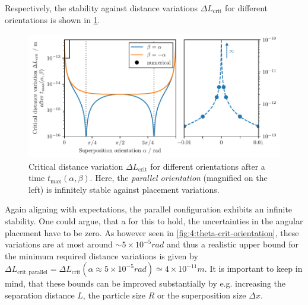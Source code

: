 Respectively, the stability against distance variations $\Delta L_\mathrm{crit}$ for different orientations is shown in \cref{fig:4:L-crit-orientation}.
\begin{figure}[!htbp]
  \centering
  \includegraphics[width=\textwidth]{./../figures/L-variance/L-crit-orientation-complete.pdf}
  \caption{Critical distance variation $\Delta L_\mathrm{crit}$ for different orientations after a time $t_\mathrm{max}(\alpha,\beta)$. Here, the \emph{parallel orientation} (magnified on the left) is infinitely stable against placement variations.}
  \label{fig:4:L-crit-orientation}
\end{figure}
Again aligning with expectations, the parallel configuration exhibits an infinite stability.
One could argue, that a for this to hold, the uncertainties in the angular placement have to be zero. As however seen in \cref{fig:4:theta-crit-orientation}, these variations are at most around $\sim 5 \times 10^{-5}\si{rad}$ and thus a realistic upper bound for the minimum required distance variations is given by $\Delta L_\mathrm{crit,parallel} = \Delta L_\mathrm{crit}(\alpha \approx 5\times 10^{-5}\si{rad}) \simeq 4\times 10^{-11}\si{m}$.
It is important to keep in mind, that these bounds can be improved substantially by e.g. increasing the separation distance $L$, the particle size $R$ or the superposition size $\Delta x$.

